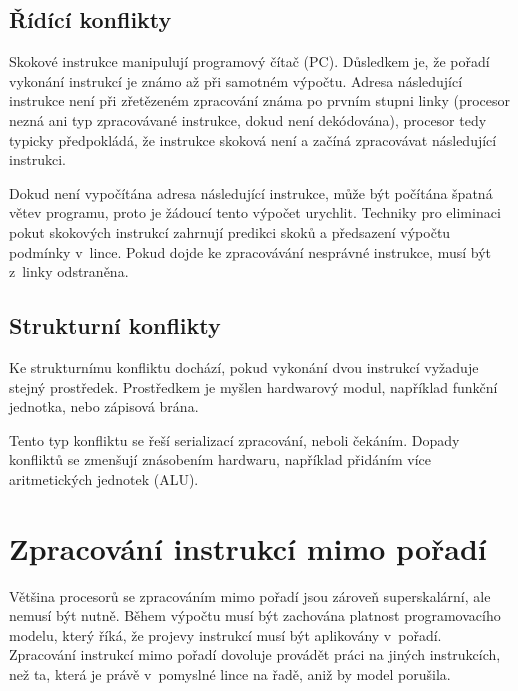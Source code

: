 \subsection{Řídící konflikty}

Skokové instrukce manipulují programový čítač (PC).
Důsledkem je, že pořadí vykonání instrukcí je známo až při samotném výpočtu.
Adresa následující instrukce není při zřetězeném zpracování známa po prvním stupni linky (procesor nezná ani typ zpracovávané instrukce, dokud není dekódována), procesor tedy typicky předpokládá, že instrukce skoková není a začíná zpracovávat následující instrukci.

Dokud není vypočítána adresa následující instrukce, může být počítána špatná větev programu, proto je žádoucí tento výpočet urychlit.
Techniky pro eliminaci pokut skokových instrukcí zahrnují predikci skoků a předsazení výpočtu podmínky v~lince.
Pokud dojde ke zpracovávání nesprávné instrukce, musí být z~linky odstraněna.

\subsection{Strukturní konflikty}

Ke strukturnímu konfliktu dochází, pokud vykonání dvou instrukcí vyžaduje stejný prostředek.
Prostředkem je myšlen hardwarový modul, například funkční jednotka, nebo zápisová brána.

Tento typ konfliktu se řeší serializací zpracování, neboli čekáním.
Dopady konfliktů se zmenšují znásobením hardwaru, například přidáním více aritmetických jednotek (ALU).

\section{Zpracování instrukcí mimo pořadí}
\label{chap:ooo}

Většina procesorů se zpracováním mimo pořadí jsou zároveň superskalární, ale nemusí být nutně.
Během výpočtu musí být zachována platnost programovacího modelu, který říká, že projevy instrukcí musí být aplikovány v~pořadí.
Zpracování instrukcí mimo pořadí dovoluje provádět práci na jiných instrukcích, než ta, která je právě v~pomyslné lince na řadě, aniž by model porušila.


